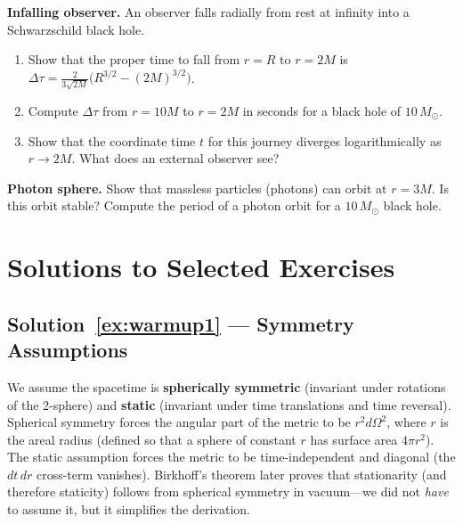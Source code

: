 \documentclass[12pt]{article}
\theoremstyle{definition}
\theoremstyle{remark}
\begin{document}
\begin{exbox}[label=ex:app5]
  \textbf{Infalling observer.} An observer falls radially from rest at infinity
  into a Schwarzschild black hole.
  \begin{enumerate}[label=(\alph*)]
    \item Show that the proper time to fall from $r = R$ to $r = 2M$ is
          $\displaystyle \Delta\tau = \frac{2}{3\sqrt{2M}}\big(R^{3/2} - (2M)^{3/2}\big)$.
    \item Compute $\Delta\tau$ from $r=10M$ to $r=2M$ in seconds for a black hole
          of $10\,M_{\odot}$.
    \item Show that the coordinate time $t$ for this journey diverges logarithmically
          as $r \to 2M$. What does an external observer see?
  \end{enumerate}
\end{exbox}

\begin{exbox}[label=ex:app6]
  \textbf{Photon sphere.} Show that massless particles (photons) can orbit at
  $r = 3M$. Is this orbit stable? Compute the period of a photon orbit for a
  $10\,M_{\odot}$ black hole.
\end{exbox}

\appendix
\section{Solutions to Selected Exercises}

\subsection*{Solution~\ref{ex:warmup1} --- Symmetry Assumptions}

We assume the spacetime is \textbf{spherically symmetric} (invariant under rotations of the
2-sphere) and \textbf{static} (invariant under time translations and time reversal).
Spherical symmetry forces the angular part of the metric to be $r^{2}d\Omega^{2}$, where
$r$ is the areal radius (defined so that a sphere of constant $r$ has surface area
$4\pi r^{2}$). The static assumption forces the metric to be time-independent and
diagonal (the $dt\,dr$ cross-term vanishes). Birkhoff's theorem later proves that
stationarity (and therefore staticity) follows from spherical symmetry in vacuum---we
did not \emph{have} to assume it, but it simplifies the derivation.
\end{document}
